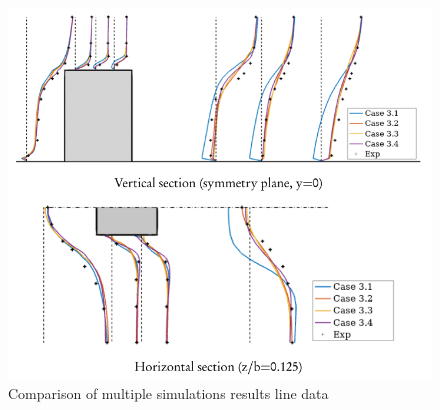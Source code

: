 \begin{figure}[h!]
    \centering
    \includegraphics[width=1.0\linewidth]{imgs/qualitative_package.png}
    \caption{Comparison of multiple simulations results line data}
    \label{Line data visualization along with experiment point data}
\end{figure}


\clearpage

